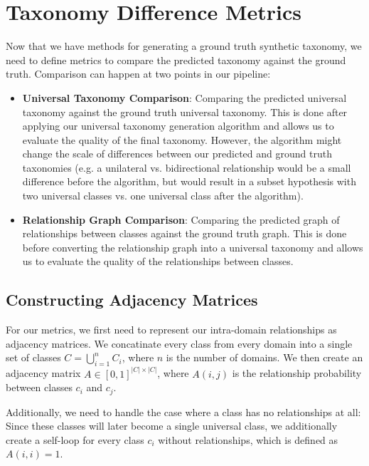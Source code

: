 \section{Taxonomy Difference Metrics}

Now that we have methods for generating a ground truth synthetic taxonomy,
we need to define metrics to compare the predicted taxonomy against the ground truth.
Comparison can happen at two points in our pipeline:
\begin{itemize}
      \item \textbf{Universal Taxonomy Comparison}: Comparing the predicted universal taxonomy against the ground truth universal taxonomy.
            This is done after applying our universal taxonomy generation algorithm
            and allows us to evaluate the quality of the final taxonomy.
            However, the algorithm might change the scale of differences between our predicted and ground truth taxonomies
            (e.g. a unilateral vs. bidirectional relationship would be a small difference before the algorithm,
            but would result in a subset hypothesis with two universal classes vs. one universal class after the algorithm).
      \item \textbf{Relationship Graph Comparison}: Comparing the predicted graph of relationships between classes against the ground truth graph.
            This is done before converting the relationship graph into a universal taxonomy
            and allows us to evaluate the quality of the relationships between classes.
\end{itemize}

\subsection{Constructing Adjacency Matrices}

For our metrics, we first need to represent our intra-domain relationships as adjacency matrices.
We concatinate every class from every domain into a single set of classes $C = \bigcup_{i=1}^n C_i$,
where $n$ is the number of domains.
We then create an adjacency matrix $A\in [0, 1]^{|C|\times|C|}$,
where $A(i,j)$ is the relationship probability between classes $c_i$ and $c_j$.

Additionally, we need to handle the case where a class has no relationships at all:
Since these classes will later become a single universal class,
we additionally create a self-loop for every class $c_i$ without relationships,
which is defined as $A(i,i) = 1$.

